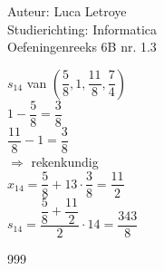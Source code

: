 \documentclass[a4paper]{article}
\begin{document}
  
\noindent \large Auteur: Luca Letroye \\
\noindent \large Studierichting: Informatica\\
\noindent \large Oefeningenreeks 6B nr. 1.3

\medskip
\normalsize

$s_{14}$ van $\left(\dfrac{5}{8}, 1, \dfrac{11}{8}, \dfrac{7}{4} \right)$\\

$1-\dfrac{5}{8} = \dfrac{3}{8}$\\

$\dfrac{11}{8}- 1 = \dfrac{3}{8}$\\

$\Rightarrow$ rekenkundig \\

$x_{14} = \dfrac{5}{8}+13\cdot \dfrac{3}{8} = \dfrac{11}{2}$\\

$s_{14} = \dfrac{\dfrac{5}{8}+\dfrac{11}{2}}{2}\cdot 14 = \dfrac{343}{8}$\\


\begin{thebibliography}{999}
\end{thebibliography}
\end{document}
